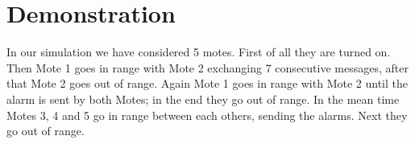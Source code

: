 \documentclass[12pt]{article}
\begin{document}
\section{Demonstration}
In our simulation we have considered 5 motes. First of all they are turned on. Then Mote 1 goes in range with Mote 2 exchanging 7 consecutive messages, after that Mote 2 goes out of range. Again Mote 1 goes in range with Mote 2 until the alarm is sent by both Motes; in the end they go out of range. In the mean time Motes 3, 4 and 5 go in range between each others, sending the alarms. Next they go out of range.
\end{document}
